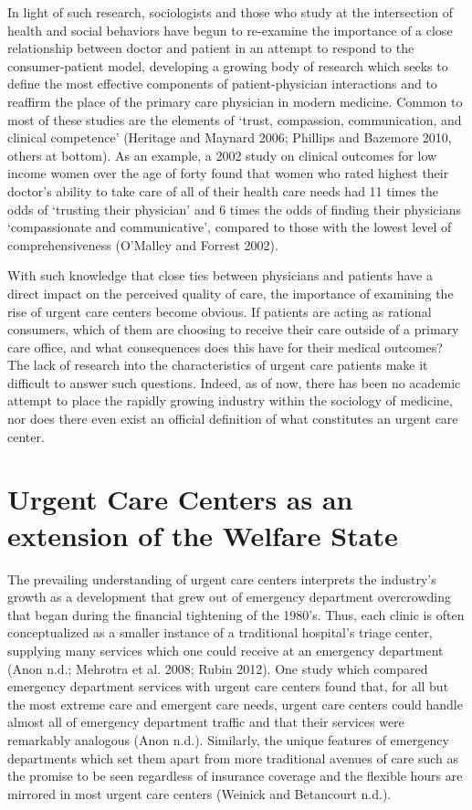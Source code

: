 \documentclass[12pt,twoside]{reedthesis}
\begin{document}
  In light of such research, sociologists and those who study at the
  intersection of health and social behaviors have begun to re-examine the
  importance of a close relationship between doctor and patient in an
  attempt to respond to the consumer-patient model, developing a growing
  body of research which seeks to define the most effective components of
  patient-physician interactions and to reaffirm the place of the primary
  care physician in modern medicine. Common to most of these studies are
  the elements of `trust, compassion, communication, and clinical
  competence' (Heritage and Maynard 2006; Phillips and Bazemore 2010,
  others at bottom). As an example, a 2002 study on clinical outcomes for
  low income women over the age of forty found that women who rated
  highest their doctor's ability to take care of all of their health care
  needs had 11 times the odds of `trusting their physician' and 6 times
  the odds of finding their physicians `compassionate and communicative',
  compared to those with the lowest level of comprehensiveness (O'Malley
  and Forrest 2002).
  
  With such knowledge that close ties between physicians and patients have
  a direct impact on the perceived quality of care, the importance of
  examining the rise of urgent care centers become obvious. If patients
  are acting as rational consumers, which of them are choosing to receive
  their care outside of a primary care office, and what consequences does
  this have for their medical outcomes? The lack of research into the
  characteristics of urgent care patients make it difficult to answer such
  questions. Indeed, as of now, there has been no academic attempt to
  place the rapidly growing industry within the sociology of medicine, nor
  does there even exist an official definition of what constitutes an
  urgent care center.
  
  \section{Urgent Care Centers as an extension of the Welfare
  State}\label{urgent-care-centers-as-an-extension-of-the-welfare-state}
  
  The prevailing understanding of urgent care centers interprets the
  industry's growth as a development that grew out of emergency department
  overcrowding that began during the financial tightening of the 1980's.
  Thus, each clinic is often conceptualized as a smaller instance of a
  traditional hospital's triage center, supplying many services which one
  could receive at an emergency department (Anon n.d.; Mehrotra et al.
  2008; Rubin 2012). One study which compared emergency department
  services with urgent care centers found that, for all but the most
  extreme care and emergent care needs, urgent care centers could handle
  almost all of emergency department traffic and that their services were
  remarkably analogous (Anon n.d.). Similarly, the unique features of
  emergency departments which set them apart from more traditional avenues
  of care such as the promise to be seen regardless of insurance coverage
  and the flexible hours are mirrored in most urgent care centers (Weinick
  and Betancourt n.d.).
  
\end{document}
